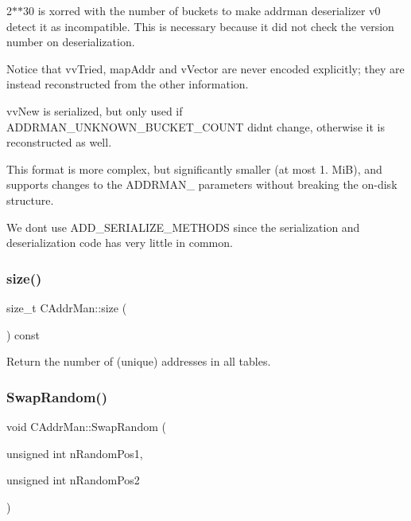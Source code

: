 2$\ast$$\ast$30 is xorred with the number of buckets to make addrman deserializer v0 detect it as incompatible. This is necessary because it did not check the version number on deserialization.

Notice that vv\+Tried, map\+Addr and v\+Vector are never encoded explicitly; they are instead reconstructed from the other information.

vv\+New is serialized, but only used if A\+D\+D\+R\+M\+A\+N\+\_\+\+U\+N\+K\+N\+O\+W\+N\+\_\+\+B\+U\+C\+K\+E\+T\+\_\+\+C\+O\+U\+NT didn\textquotesingle{}t change, otherwise it is reconstructed as well.

This format is more complex, but significantly smaller (at most 1. MiB), and supports changes to the A\+D\+D\+R\+M\+A\+N\+\_\+ parameters without breaking the on-\/disk structure.

We don\textquotesingle{}t use A\+D\+D\+\_\+\+S\+E\+R\+I\+A\+L\+I\+Z\+E\+\_\+\+M\+E\+T\+H\+O\+DS since the serialization and deserialization code has very little in common. \mbox{\label{class_c_addr_man_a244508e8463c4fdfd8b085fcb3b5a225}} 
\subsubsection{\texorpdfstring{size()}{size()}}
{\footnotesize\ttfamily size\+\_\+t C\+Addr\+Man\+::size (\begin{DoxyParamCaption}{ }\end{DoxyParamCaption}) const\hspace{0.3cm}{\ttfamily [inline]}}



Return the number of (unique) addresses in all tables. 

\mbox{\label{class_c_addr_man_a3074bc8e3dcfb5348054613f575dc38e}} 
\subsubsection{\texorpdfstring{Swap\+Random()}{SwapRandom()}}
{\footnotesize\ttfamily void C\+Addr\+Man\+::\+Swap\+Random (\begin{DoxyParamCaption}\item[{unsigned int}]{n\+Random\+Pos1,  }\item[{unsigned int}]{n\+Random\+Pos2 }\end{DoxyParamCaption})\hspace{0.3cm}{\ttfamily [protected]}}



